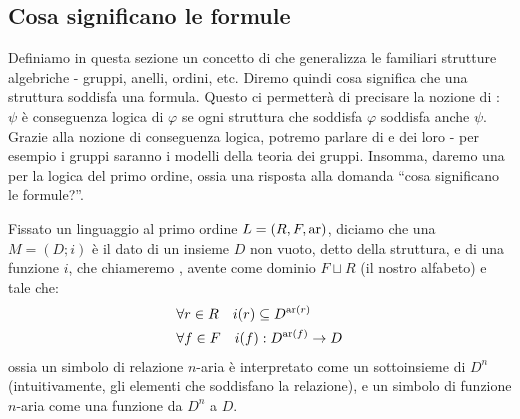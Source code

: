\subsection{Cosa significano le formule}
Definiamo in questa sezione un concetto di  che generalizza le familiari strutture algebriche - gruppi, anelli, ordini, etc.
Diremo quindi cosa significa che una struttura soddisfa una formula. Questo ci permetterà di precisare la nozione di :
$\psi$ è conseguenza logica di $\varphi$ se ogni struttura che soddisfa $\varphi$ soddisfa anche $\psi$. Grazie alla nozione di conseguenza logica, potremo parlare 
di  e dei loro  - per esempio i gruppi saranno i modelli della teoria dei gruppi.
Insomma, daremo una  per la logica del primo ordine, ossia una risposta alla domanda ``cosa significano le formule?''.

\begin{definition}
    [$L$-struttura]
    Fissato un linguaggio al primo ordine $L = (R,F,\operatorname{ar})$, diciamo che una  $M = (D;i)$ è il dato di un insieme $D$ non vuoto, detto 
     della struttura, e di una funzione $i$, che chiameremo , avente come dominio $F \sqcup R$ (il nostro alfabeto) e tale che:
    \begin{align*}
        &\forall r \in  R \quad i(r) \subseteq D^{\operatorname{ar}(r)} \\
        &\forall f \in F \quad i(f) : D^{\operatorname{ar}(f)} \to D
    \end{align*}
    ossia un simbolo di relazione $n$-aria è interpretato come un sottoinsieme di $D^n$ (intuitivamente, gli elementi che soddisfano la relazione), e un simbolo di funzione $n$-aria come una funzione da $D^n$ a $D$.
\end{definition}

